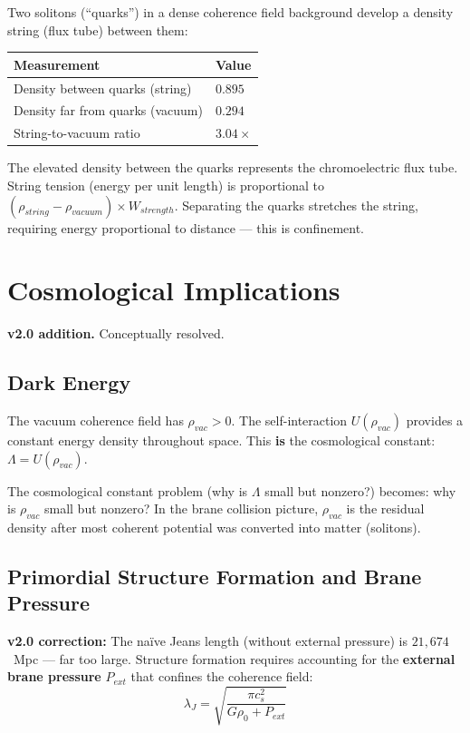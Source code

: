 \documentclass[11pt, a4paper]{article}
\begin{document}
Two solitons (``quarks'') in a dense coherence field background
develop a density string (flux tube) between them:

\begin{center}
\begin{tabular}{@{}ll@{}}
\toprule
\textbf{Measurement} & \textbf{Value} \\
\midrule
Density between quarks (string) & $0.895$ \\
Density far from quarks (vacuum) & $0.294$ \\
String-to-vacuum ratio & $3.04\times$ \\
\bottomrule
\end{tabular}
\end{center}

The elevated density between the quarks represents the chromoelectric
flux tube. String tension (energy per unit length) is proportional to
$(\rho_{string} - \rho_{vacuum}) \times W_{strength}$. Separating the
quarks stretches the string, requiring energy proportional to distance
--- this is confinement.

\section{Cosmological Implications}
\label{sec:cosmology}

\textbf{v2.0 addition.} Conceptually resolved.

\subsection{Dark Energy}

The vacuum coherence field has $\rho_{vac} > 0$. The self-interaction
$U(\rho_{vac})$ provides a constant energy density throughout space.
This \textbf{is} the cosmological constant:
$\Lambda = U(\rho_{vac})$.

The cosmological constant problem (why is $\Lambda$ small but nonzero?)
becomes: why is $\rho_{vac}$ small but nonzero? In the brane collision
picture, $\rho_{vac}$ is the residual density after most coherent
potential was converted into matter (solitons).

\subsection{Primordial Structure Formation and Brane Pressure}

\textbf{v2.0 correction:} The na\"ive Jeans length (without external
pressure) is $21{,}674$~Mpc --- far too large. Structure formation
requires accounting for the \textbf{external brane pressure} $P_{ext}$
that confines the coherence field:
\begin{equation}
  \lambda_J = \sqrt{\frac{\pi c_s^2}{G\rho_0 + P_{ext}}}
\end{equation}
\end{document}
